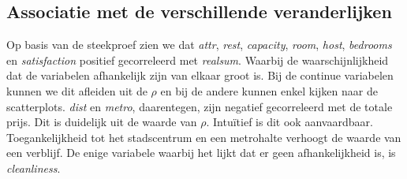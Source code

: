 \documentclass[a4paper]{kulakarticle}
\begin{document}
	\subsection{Associatie met de verschillende veranderlijken}
	
	Op basis van de steekproef zien we dat \textit{attr}, \textit{rest}, \textit{capacity}, \textit{room}, \textit{host}, \textit{bedrooms} en \textit{satisfaction} positief gecorreleerd met \textit{realsum}. Waarbij de waarschijnlijkheid dat de variabelen afhankelijk zijn van elkaar groot is. Bij de continue variabelen kunnen we dit afleiden uit de $\rho$ en bij de andere kunnen enkel kijken naar de scatterplots.  \textit{dist} en \textit{metro}, daarentegen, zijn negatief gecorreleerd met de totale prijs. Dit is duidelijk uit de waarde van $\rho$. Intuïtief is dit ook aanvaardbaar. Toegankelijkheid tot het stadscentrum en een metrohalte verhoogt de waarde van een verblijf. De enige variabele waarbij het lijkt dat er geen afhankelijkheid is, is \textit{cleanliness}.
\end{document}
